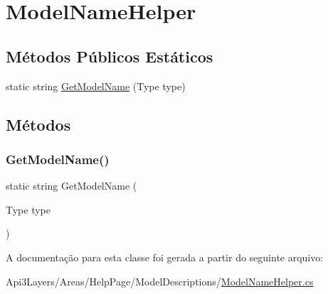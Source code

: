 \hypertarget{classApi3Layers_1_1Areas_1_1HelpPage_1_1ModelDescriptions_1_1ModelNameHelper}{}\section{Model\+Name\+Helper}
\label{classApi3Layers_1_1Areas_1_1HelpPage_1_1ModelDescriptions_1_1ModelNameHelper}
\subsection*{Métodos Públicos Estáticos}
\begin{DoxyCompactItemize}
\item 
static string \hyperlink{classApi3Layers_1_1Areas_1_1HelpPage_1_1ModelDescriptions_1_1ModelNameHelper_a94996770939db3fd96b3421ea1907cdb}{Get\+Model\+Name} (Type type)
\end{DoxyCompactItemize}


\subsection{Métodos}
\mbox{\label{classApi3Layers_1_1Areas_1_1HelpPage_1_1ModelDescriptions_1_1ModelNameHelper_a94996770939db3fd96b3421ea1907cdb}} 
\subsubsection{\texorpdfstring{Get\+Model\+Name()}{GetModelName()}}
{\footnotesize\ttfamily static string Get\+Model\+Name (\begin{DoxyParamCaption}\item[{Type}]{type }\end{DoxyParamCaption})\hspace{0.3cm}{\ttfamily [static]}}



A documentação para esta classe foi gerada a partir do seguinte arquivo\+:\begin{DoxyCompactItemize}
\item 
Api3\+Layers/\+Areas/\+Help\+Page/\+Model\+Descriptions/\hyperlink{ModelNameHelper_8cs}{Model\+Name\+Helper.\+cs}\end{DoxyCompactItemize}
